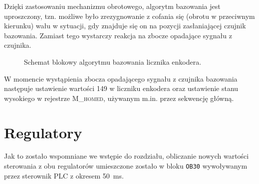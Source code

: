 Dzięki zastosowaniu mechanizmu obrotowego, algorytm bazowania jest uproszczony, tzn. możliwe było zrezygnowanie z cofania się (obrotu w przeciwnym kierunku) wału w sytuacji, gdy znajduje się on na pozycji zasłaniającej czujnik bazowania. Zamiast tego wystarczy reakcja na zbocze opadające sygnału z czujnika.

\begin{figure}[ht]
    \centering
    
    
    \caption{Schemat blokowy algorytmu bazowania licznika enkodera.}
    \label{fig:schemat_bazowania}
\end{figure}

W momencie wystąpienia zbocza opadającego sygnału z czujnika bazowania następuje ustawienie wartości \num{149} w liczniku enkodera oraz ustawienie stanu wysokiego w rejestrze \textsc{M\_homed}, używanym m.in. przez sekwencję główną.

\section{Regulatory}
\label{sec:ch7_regulatory}

Jak to zostało wspomniane we wstępie do rozdziału, obliczanie nowych wartości sterowania z obu regulatorów umieszczone zostało w bloku \texttt{OB30} wywoływanym przez sterownik PLC z okresem \SI{50}{\milli\second}.


